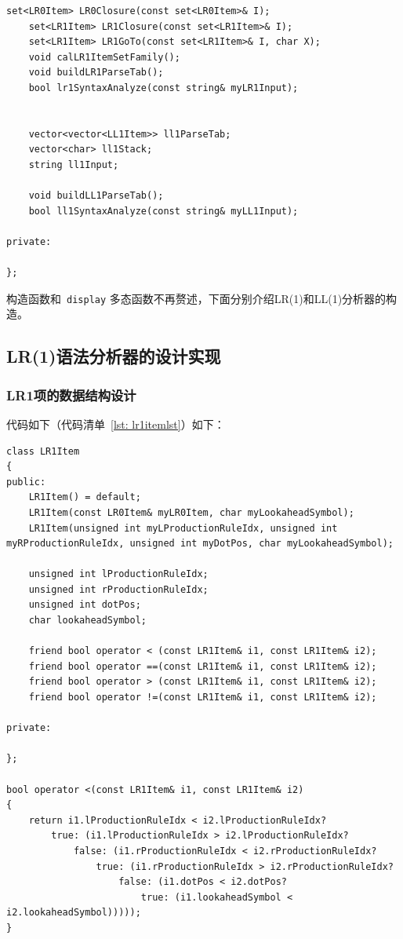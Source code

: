 \documentclass{article}
\begin{document}
\begin{CJK*}{UTF8}{gbsn}
\begin{center}
\begin{lstlisting}[caption = {\texttt{SyntaxAnalyzer} 类定义代码清单}, label = {lst: classdeclarationlst}]
	set<LR0Item> LR0Closure(const set<LR0Item>& I);
	set<LR1Item> LR1Closure(const set<LR1Item>& I);
	set<LR1Item> LR1GoTo(const set<LR1Item>& I, char X);
	void calLR1ItemSetFamily();
	void buildLR1ParseTab();
	bool lr1SyntaxAnalyze(const string& myLR1Input);


	vector<vector<LL1Item>> ll1ParseTab;
	vector<char> ll1Stack;
	string ll1Input;

	void buildLL1ParseTab();
	bool ll1SyntaxAnalyze(const string& myLL1Input);

private:

};
\end{lstlisting}
\end{center}

构造函数和~\texttt{display} 多态函数不再赘述，下面分别介绍LR(1)和LL(1)分析器的构造。

\subsection{LR(1)语法分析器的设计实现}
\subsubsection{LR1项的数据结构设计}
代码如下（代码清单~\ref{lst: lr1itemlst}）如下：
\begin{center}
\begin{lstlisting}[caption = {LR1项的数据结构设计代码清单}, label = {lst: lr1itemlst}]
class LR1Item
{
public:
	LR1Item() = default;
	LR1Item(const LR0Item& myLR0Item, char myLookaheadSymbol);
	LR1Item(unsigned int myLProductionRuleIdx, unsigned int myRProductionRuleIdx, unsigned int myDotPos, char myLookaheadSymbol);

	unsigned int lProductionRuleIdx;
	unsigned int rProductionRuleIdx;
	unsigned int dotPos;
	char lookaheadSymbol;

	friend bool operator < (const LR1Item& i1, const LR1Item& i2);
	friend bool operator ==(const LR1Item& i1, const LR1Item& i2);
	friend bool operator > (const LR1Item& i1, const LR1Item& i2);
	friend bool operator !=(const LR1Item& i1, const LR1Item& i2);

private:

};

bool operator <(const LR1Item& i1, const LR1Item& i2)
{
	return i1.lProductionRuleIdx < i2.lProductionRuleIdx?
		true: (i1.lProductionRuleIdx > i2.lProductionRuleIdx?
			false: (i1.rProductionRuleIdx < i2.rProductionRuleIdx?
				true: (i1.rProductionRuleIdx > i2.rProductionRuleIdx?
					false: (i1.dotPos < i2.dotPos?
						true: (i1.lookaheadSymbol < i2.lookaheadSymbol)))));
}


\end{lstlisting}
\end{center}
\end{CJK*}
\end{document}
